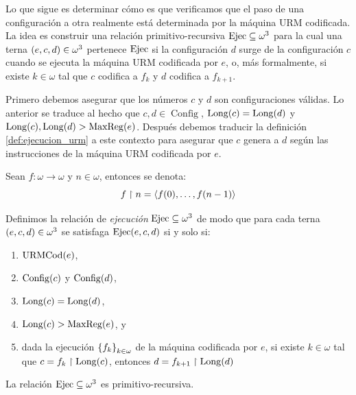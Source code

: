 Lo que sigue es determinar cómo es que verificamos que el paso de una configuración a otra realmente está determinada por la máquina URM codificada. La idea es construir una relación primitivo-recursiva $\EJECUCION\subseteq\omega^{3}$ para la cual una terna $\pa*{e, c, d}\in\omega^{3}$ pertenece $\EJECUCION$ si la configuración $d$ surge de la configuración $c$ cuando se ejecuta la máquina URM codificada por $e$, o, más formalmente, si existe $k\in\omega$ tal que $c$ codifica a $f_{k}$ y $d$ codifica a $f_{k + 1}$.

Primero debemos asegurar que los números $c$ y $d$ son configuraciones válidas. Lo anterior se traduce al hecho que $c, d\in\operatorname{Config}$, $\LONGITUD\pa*{c}=\LONGITUD\pa*{d}$ y $\LONGITUD\pa*{c},\LONGITUD\pa*{d} >\MAXREGISTRO\pa*{e}$. Después debemos traducir la definición \ref{def:ejecucion_urm} a este contexto para asegurar que $c$ genera a $d$ según las instrucciones de la máquina URM codificada por $e$.

\begin{notation}
	Sean $f:\omega\to\omega$ y $n\in\omega$, entonces se denota:
	\[
		f\upharpoonright n =\inner*{f\pa*{0},\dotsc, f\pa*{n - 1}}
	\]
\end{notation}

\begin{definition}
	\label{def: computo_urm}
	Definimos la relación de \emph{ejecución} $\EJECUCION\subseteq\omega^{3}$ de modo que para cada terna $\pa*{e, c, d}\in\omega^{3}$ se satisfaga $\EJECUCION\pa*{e, c, d}$ si y solo si:

	\begin{enumerate}
		\item $\URMCODIGO\pa*{e}$,
		\item $\CONFIGURACIONES\pa*{c}$ y $\CONFIGURACIONES\pa*{d}$,
		\item $\LONGITUD\pa*{c} =\LONGITUD\pa*{d}$,
		\item $\LONGITUD\pa*{c} >\MAXREGISTRO\pa*{e}$, y
		\item dada la ejecución $\set*{f_{k}}_{k\in\omega}$ de la máquina codificada por $e$, si existe $k\in\omega$ tal que $c = f_{k}\upharpoonright\LONGITUD\pa*{c}$, entonces $d = f_{k + 1}\upharpoonright\LONGITUD\pa*{d}$
	\end{enumerate}
\end{definition}

\begin{theorem}
	\label{theo: ejec_primitiva} %
	La relación $\EJECUCION\subseteq\omega^{3}$ es primitivo-recursiva.
\end{theorem}

